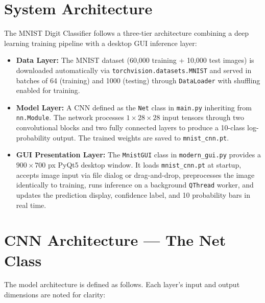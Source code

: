 \documentclass[12pt,a4paper,openany]{report}
\begin{document}
\section{System Architecture}

The MNIST Digit Classifier follows a three-tier architecture combining a deep learning training pipeline with a desktop GUI inference layer:

\begin{itemize}
    \item \textbf{Data Layer:} The MNIST dataset (60,000 training + 10,000 test images) is downloaded automatically via \texttt{torchvision.datasets.MNIST} and served in batches of 64 (training) and 1000 (testing) through \texttt{DataLoader} with shuffling enabled for training.
    \item \textbf{Model Layer:} A CNN defined as the \texttt{Net} class in \texttt{main.py} inheriting from \texttt{nn.Module}. The network processes $1 \times 28 \times 28$ input tensors through two convolutional blocks and two fully connected layers to produce a 10-class log-probability output. The trained weights are saved to \texttt{mnist\_cnn.pt}.
    \item \textbf{GUI Presentation Layer:} The \texttt{MnistGUI} class in \texttt{modern\_gui.py} provides a $900 \times 700$ px PyQt5 desktop window. It loads \texttt{mnist\_cnn.pt} at startup, accepts image input via file dialog or drag-and-drop, preprocesses the image identically to training, runs inference on a background \texttt{QThread} worker, and updates the prediction display, confidence label, and 10 probability bars in real time.
\end{itemize}

\section{CNN Architecture --- The Net Class}

The model architecture is defined as follows. Each layer's input and output dimensions are noted for clarity:
\end{document}
